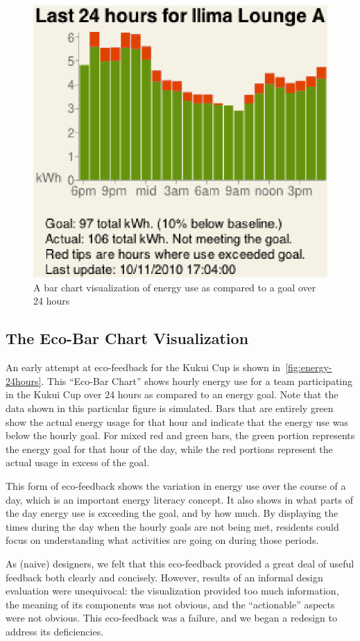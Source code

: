 \documentclass{sigchi}
\begin{document}
\begin{figure}[!t]
\centering
\includegraphics[width=0.7\columnwidth]{energy-24hours-new.eps}
\caption{A bar chart visualization of energy use as compared to a goal over 24 hours}
\label{fig:energy-24hours}
\end{figure}

\subsection{The Eco-Bar Chart Visualization}
An early attempt at eco-feedback for the Kukui Cup is shown in~\autoref{fig:energy-24hours}. This ``Eco-Bar Chart'' shows hourly energy use for a team participating in the Kukui Cup over 24 hours as compared to an energy goal. Note that the data shown in this particular figure is simulated. Bars that are entirely green show the actual energy usage for that hour and indicate that the energy use was below the hourly goal. For mixed red and green bars, the green portion represents the energy goal for that hour of the day, while the red portions represent the actual usage in excess of the goal.

This form of eco-feedback shows the variation in energy use over the course of a day, which is an important energy literacy concept. It also shows in what parts of the day energy use is exceeding the goal, and by how much. By displaying the times during the day when the hourly goals are not being met, residents could focus on understanding what activities are going on during those periods.

As (naive) designers, we felt that this eco-feedback provided a great deal of useful feedback both clearly and concisely.  However, results of an informal design evaluation were unequivocal: the visualization provided too much information, the meaning of its components was not obvious, and the ``actionable'' aspects were not obvious.  This eco-feedback was a failure, and we began a redesign to address its deficiencies.
\end{document}
